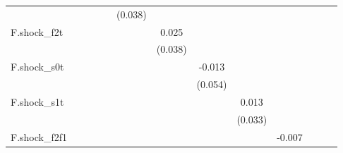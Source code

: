 {\begin{tabular}{l*{12}{c}}
            &                     &                     &                     &                     &     (0.038)         &                     &                     &                     &                     &                     &                     &                     \\
\addlinespace
F.shock\_f2t &                     &                     &                     &                     &                     &       0.025         &                     &                     &                     &                     &                     &                     \\
            &                     &                     &                     &                     &                     &     (0.038)         &                     &                     &                     &                     &                     &                     \\
\addlinespace
F.shock\_s0t &                     &                     &                     &                     &                     &                     &      -0.013         &                     &                     &                     &                     &                     \\
            &                     &                     &                     &                     &                     &                     &     (0.054)         &                     &                     &                     &                     &                     \\
\addlinespace
F.shock\_s1t &                     &                     &                     &                     &                     &                     &                     &       0.013         &                     &                     &                     &                     \\
            &                     &                     &                     &                     &                     &                     &                     &     (0.033)         &                     &                     &                     &                     \\
\addlinespace
F.shock\_f2f1&                     &                     &                     &                     &                     &                     &                     &                     &      -0.007         &                     &                     &                     \\

\end{tabular}}
